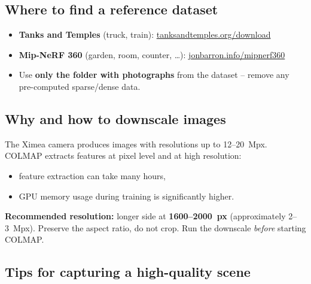 \documentclass{article}
\begin{document}
\subsection*{Where to find a reference dataset}

\begin{itemize}
    \item \textbf{Tanks and Temples} (truck, train):
          \href{https://www.tanksandtemples.org/download/}{tanksandtemples.org/download}
    \item \textbf{Mip-NeRF 360} (garden, room, counter, \ldots):
          \href{https://jonbarron.info/mipnerf360/}{jonbarron.info/mipnerf360}
    \item Use \textbf{only the folder with photographs} from the dataset --
          remove any pre-computed sparse/dense data.
\end{itemize}

\subsection*{Why and how to downscale images}

The Ximea camera produces images with resolutions up to 12--20~Mpx.
COLMAP extracts features at pixel level and at high resolution:
\begin{itemize}
    \item feature extraction can take many hours,
    \item GPU memory usage during training is significantly higher.
\end{itemize}
\textbf{Recommended resolution:} longer side at \textbf{1600--2000~px}
(approximately 2--3~Mpx).
Preserve the aspect ratio, do not crop.
Run the downscale \emph{before} starting COLMAP.

\subsection*{Tips for capturing a high-quality scene}
\end{document}
